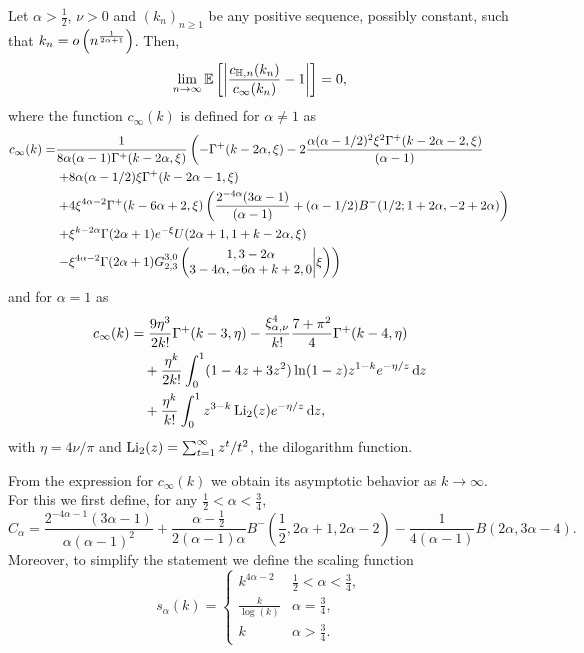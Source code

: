 \begin{theorem}
\label{thm:local_clustering_hyperbolic}
Let $\alpha > \frac{1}{2}$, $\nu > 0$ and $(k_n)_{n \ge 1}$ be any positive sequence, possibly constant, such that $k_n = \smallO{n^{\frac{1}{2\alpha + 1}}}$. Then, 
\[
	\lim_{n \to \infty} \Exp{\left|\frac{c_{\H,n}(k_n)}{c_\infty(k_n)} - 1\right|} = 0,
\]
where the function $c_\infty(k)$ is defined for $\alpha \ne 1$ as
\begin{align*}
c_\infty(k)  =&\frac{1}{8\alpha (\alpha-1)\Gamma^+(k-2\alpha,\xi)} \left( -\Gamma^+(k - 2 \alpha, \xi) - 2\frac{\alpha (\alpha - 1/2)^2 \xi^{2} \Gamma^+(k - 2 \alpha - 2, \xi)}{(\alpha - 1)} \right. \\ 
&\left.+ 8 \alpha (\alpha - 1/2) \xi \Gamma^+(k - 2 \alpha - 1,\xi) \right.\\ 
&\left.+ 4\xi^{4\alpha - 2} \Gamma^+(k - 6 \alpha + 2, 
      \xi) \left( \frac{2^{ - 4\alpha}(3 \alpha - 1)}{(\alpha - 1)} + (\alpha - 1/2) B^-(1/2; 1 + 2 \alpha, -2 + 2 \alpha) \right)  \right.\\ 
&\left.+ \xi^{k-2\alpha} \Gamma(2\alpha+1)e^{-\xi} U(2\alpha+1,1+k-2\alpha,\xi) \right. \\ 
&\left.- \xi^{4\alpha-2} \Gamma(2\alpha+1)\MeijerG{3}{0}{2}{3}{1,3-2\alpha}{3-4\alpha,-6\alpha+k+2,0}{\xi}  \right)
\end{align*}
and for $\alpha = 1$ as
\begin{align*}
	c_\infty(k) &= \frac{9 \eta^3}{2 k!} 	
		\Gamma^+(k-3,\eta)-\frac{\xi_{\alpha,\nu}^4}{k!}\frac{7+\pi^2}{4}\Gamma^+(k-4,\eta)\\
	&\hspace{10pt}+ \frac{\eta^k}{2k!}\int_0^1 (1-4z+3z^2)\ln(1-z)z^{1-k}e^{-\eta/z}\dd z\\ 
	&\hspace{10pt}+ \frac{\eta^k}{k!}\int_0^1 z^{3-k} \Li_2(z) e^{-\eta/z} \dd z,
\end{align*}
with $\eta = 4\nu/\pi$ and $\Li_2(z) = \sum_{t = 1}^\infty z^t/t^2$, the dilogarithm function.
\end{theorem}

From the expression for $c_\infty(k)$ we obtain its asymptotic behavior as $k \to \infty$. For this we first define, for any $\frac{1}{2} < \alpha < \frac{3}{4}$,
\begin{equation}\label{eq:def_C_alpha}
	C_\alpha = \frac{2^{-4\alpha - 1}(3\alpha - 1)}{\alpha(\alpha-1)^2} 
	+ \frac{\alpha - \frac{1}{2}}{2(\alpha - 1)\alpha} B^-(\frac{1}{2},2\alpha + 1, 2\alpha - 2)
	- \frac{1}{4(\alpha - 1)}B(2\alpha, 3\alpha - 4).
\end{equation}
Moreover, to simplify the statement we define the scaling function 
\begin{equation}\label{eq:def_scaling_function}
s_\alpha(k) = \begin{cases} 
		k^{4\alpha-2} &\frac{1}{2}<\alpha<\frac{3}{4}, \\
		\frac{k}{\log(k)} & \alpha = \frac{3}{4}, \\
		k &\alpha > \frac{3}{4}.
\end{cases}
\end{equation}

